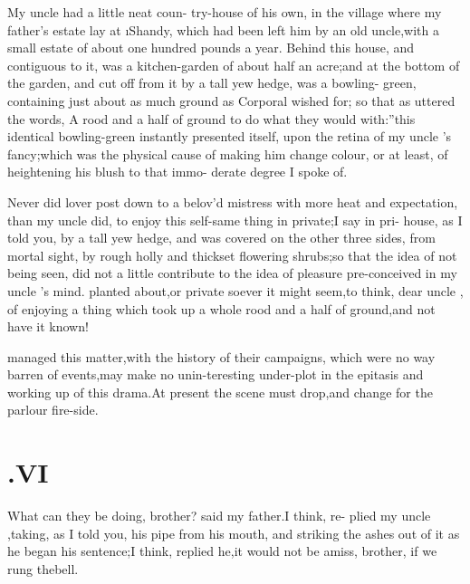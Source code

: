 \documentclass[twoside]{article}
\begin{document}
My uncle \toby had a little neat coun-\break
try-house of his own, in the village where my father’s estate lay at \i{Shandy},
which had been left him by an old uncle,\break with a small estate of
about one hundred pounds a year. Behind this house, and contiguous
to it, was a kitchen-garden of about half an acre;\tsk and at the
bottom of the garden, and cut off from it\break
by a tall yew hedge, was a bowling-\break 
green, containing just about as much
ground as Corporal
\trim wished for;\tsk\break
so that as \trim uttered the
words, \lqq A rood and a half of ground to do what\break
they would with:”\tsh this identical bowling-green instantly presented
itself,  upon the retina
of my uncle \toby's fancy;\break\tsh which was the physical
cause of making him change colour, or at least, of heightening his
blush to that immo-\break
derate degree I spoke of.

Never did lover post down to a belov’d mistress with more heat
and expectation, than my uncle \toby did, to enjoy this\break
self-same thing in private;\tsk I say in pri-\break
{} house, as
I told you, by a tall yew hedge, and was covered on the other three
sides, from mortal sight, by rough holly and thickset flowering
shrubs;\tsk so that the
idea of not being seen, did not a little contribute to the
idea of pleasure pre-conceived in my uncle \toby's
mind.\tsk\break 
{}
planted about,\tsh or private soever it\break 
might seem,\tsk to think, dear uncle \toby, 
of enjoying a thing which took up a\break
whole rood and a half of ground,\tsk and\break
not have it known!

 managed this
matter,\tsk with the history of their campaigns, which were no
way barren of events,\tsh may make no unin-\break teresting
under-plot in the epitasis and working up of this drama.\tsk At
present the scene must drop,\tsk and change for the parlour
fire-side.

\section{\chapstrut{}.\enspace  VI}

\quad\tsh What can they be doing,\break
brother? said my father.\tsk I think, re-\break
plied my uncle \toby,\tsk taking, as I told you,
his pipe from his mouth, and striking the ashes out of it as he
began his sentence;\tsh I think, replied he,\tsk it
would not be amiss, brother, if we rung the\break bell.
\end{document}
